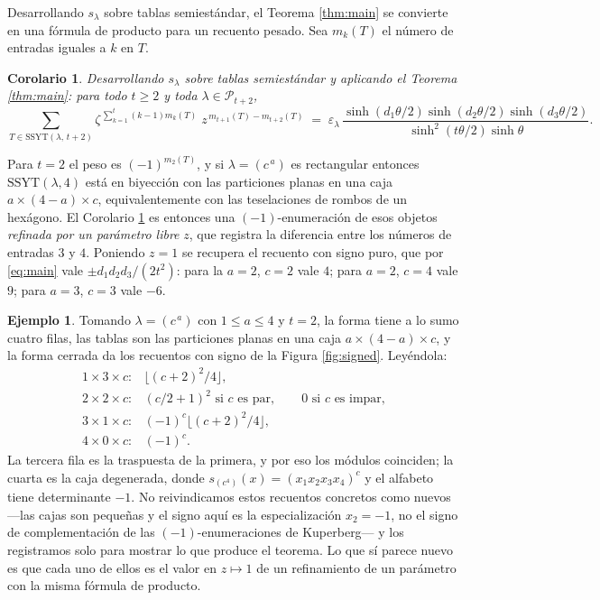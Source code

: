 \documentclass[11pt,reqno]{amsart}
\theoremstyle{plain}
\newtheorem{corollary}[theorem]{Corolario}
\theoremstyle{definition}
\newtheorem{example}[theorem]{Ejemplo}
\newcommand{\PP}{\mathcal{P}}
\begin{document}
Desarrollando $s_\lambda$ sobre tablas semiestándar, el Teorema \ref{thm:main} se convierte en una
fórmula de producto para un recuento pesado. Sea $m_k(T)$ el número de entradas iguales a $k$ en $T$.

\begin{corollary}\label{cor:enum}
Desarrollando $s_\lambda$ sobre tablas semiestándar y aplicando el Teorema \ref{thm:main}: para todo
$t\ge2$ y toda $\lambda\in\PP_{t+2}$,
\[
\sum_{T\in\mathrm{SSYT}(\lambda,\,t+2)}
\zeta^{\,\sum_{k=1}^{t}(k-1)m_k(T)}\;z^{\,m_{t+1}(T)-m_{t+2}(T)}
\;=\;\varepsilon_\lambda\,
\frac{\sinh(d_1\theta/2)\sinh(d_2\theta/2)\sinh(d_3\theta/2)}{\sinh^2(t\theta/2)\sinh\theta}.
\]
\end{corollary}

Para $t=2$ el peso es $(-1)^{m_2(T)}$, y si $\lambda=(c^{\,a})$ es rectangular entonces
$\mathrm{SSYT}(\lambda,4)$ está en biyección con las particiones planas en una caja
$a\times(4-a)\times c$, equivalentemente con las teselaciones de rombos de un hexágono. El Corolario
\ref{cor:enum} es entonces una $(-1)$-enumeración de esos objetos \emph{refinada por un parámetro
libre} $z$, que registra la diferencia entre los números de entradas $3$ y $4$. Poniendo $z=1$ se
recupera el recuento con signo puro, que por \eqref{eq:main} vale $\pm d_1d_2d_3/(2t^2)$: para la
$a=2$, $c=2$ vale $4$; para $a=2$, $c=4$ vale $9$; para $a=3$, $c=3$ vale $-6$.

\begin{example}\label{ex:boxes}
Tomando $\lambda=(c^{\,a})$ con $1\le a\le4$ y $t=2$, la forma tiene a lo sumo cuatro filas, las
tablas son las particiones planas en una caja $a\times(4-a)\times c$, y la forma cerrada da los
recuentos con signo de la Figura \ref{fig:signed}. Leyéndola:
\[
\begin{array}{ll}
1\times3\times c: & \bigl\lfloor (c+2)^2/4\bigr\rfloor,\\[2pt]
2\times2\times c: & (c/2+1)^2 \text{ si } c \text{ es par},\qquad 0 \text{ si } c \text{ es impar},\\[2pt]
3\times1\times c: & (-1)^c\bigl\lfloor (c+2)^2/4\bigr\rfloor,\\[2pt]
4\times0\times c: & (-1)^c .
\end{array}
\]
La tercera fila es la traspuesta de la primera, y por eso los módulos coinciden; la cuarta es la caja
degenerada, donde $s_{(c^4)}(x)=(x_1x_2x_3x_4)^c$ y el alfabeto tiene determinante $-1$. No
reivindicamos estos recuentos concretos como nuevos ---las cajas son pequeñas y el signo aquí es la
especialización $x_2=-1$, no el signo de complementación de las $(-1)$-enumeraciones de Kuperberg---
y los registramos solo para mostrar lo que produce el teorema. Lo que sí parece nuevo es que cada uno
de ellos es el valor en $z\mapsto1$ de un refinamiento de un parámetro con la misma fórmula de
producto.
\end{example}
\end{document}
